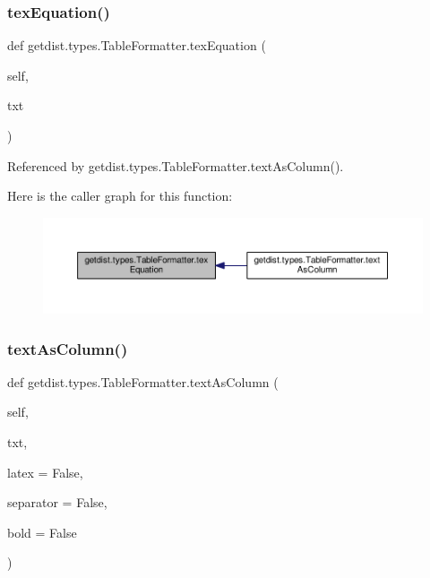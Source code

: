 \mbox{\label{classgetdist_1_1types_1_1TableFormatter_a81f4a47caca6b49af53ddac530d70f81}} 
\subsubsection{\texorpdfstring{tex\+Equation()}{texEquation()}}
{\footnotesize\ttfamily def getdist.\+types.\+Table\+Formatter.\+tex\+Equation (\begin{DoxyParamCaption}\item[{}]{self,  }\item[{}]{txt }\end{DoxyParamCaption})}



Referenced by getdist.\+types.\+Table\+Formatter.\+text\+As\+Column().

Here is the caller graph for this function\+:
\nopagebreak
\begin{figure}[H]
\begin{center}
\leavevmode
\includegraphics[width=350pt]{classgetdist_1_1types_1_1TableFormatter_a81f4a47caca6b49af53ddac530d70f81_icgraph}
\end{center}
\end{figure}
\mbox{\label{classgetdist_1_1types_1_1TableFormatter_a620c7f462cff21151aa70de66d9cd85d}} 
\subsubsection{\texorpdfstring{text\+As\+Column()}{textAsColumn()}}
{\footnotesize\ttfamily def getdist.\+types.\+Table\+Formatter.\+text\+As\+Column (\begin{DoxyParamCaption}\item[{}]{self,  }\item[{}]{txt,  }\item[{}]{latex = {\ttfamily False},  }\item[{}]{separator = {\ttfamily False},  }\item[{}]{bold = {\ttfamily False} }\end{DoxyParamCaption})}



